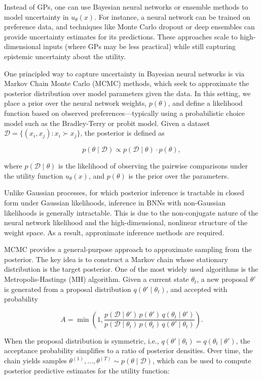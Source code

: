 \documentclass[
  letterpaper,
  numbers=noenddot,
  DIV=11]{scrreprt}
\theoremstyle{plain}
\theoremstyle{definition}
\theoremstyle{remark}
\begin{document}
Instead of GPs, one can use Bayesian neural networks or ensemble methods
to model uncertainty in \(u_\theta(x)\). For instance, a neural network
can be trained on preference data, and techniques like Monte Carlo
dropout or deep ensembles can provide uncertainty estimates for its
predictions. These approaches scale to high-dimensional inputs (where
GPs may be less practical) while still capturing epistemic uncertainty
about the utility.

One principled way to capture uncertainty in Bayesian neural networks is
via Markov Chain Monte Carlo (MCMC) methods, which seek to approximate
the posterior distribution over model parameters given the data. In this
setting, we place a prior over the neural network weights,
\(p(\theta)\), and define a likelihood function based on observed
preferences---typically using a probabilistic choice model such as the
Bradley-Terry or probit model. Given a dataset
\(\mathcal{D} = \{(x_i, x_j) : x_i \succ x_j\}\), the posterior is
defined as

\[
p(\theta \mid \mathcal{D}) \propto p(\mathcal{D} \mid \theta) \cdot p(\theta),
\]

where \(p(\mathcal{D} \mid \theta)\) is the likelihood of observing the
pairwise comparisons under the utility function \(u_\theta(x)\), and
\(p(\theta)\) is the prior over the parameters.

Unlike Gaussian processes, for which posterior inference is tractable in
closed form under Gaussian likelihoods, inference in BNNs with
non-Gaussian likelihoods is generally intractable. This is due to the
non-conjugate nature of the neural network likelihood and the
high-dimensional, nonlinear structure of the weight space. As a result,
approximate inference methods are required.

MCMC provides a general-purpose approach to approximate sampling from
the posterior. The key idea is to construct a Markov chain whose
stationary distribution is the target posterior. One of the most widely
used algorithms is the Metropolis-Hastings (MH) algorithm. Given a
current state \(\theta_t\), a new proposal \(\theta'\) is generated from
a proposal distribution \(q(\theta' \mid \theta_t)\), and accepted with
probability

\[
A = \min\left(1, \frac{p(\mathcal{D} \mid \theta') \, p(\theta') \, q(\theta_t \mid \theta')}{p(\mathcal{D} \mid \theta_t) \, p(\theta_t) \, q(\theta' \mid \theta_t)}\right).
\]

When the proposal distribution is symmetric, i.e.,
\(q(\theta' \mid \theta_t) = q(\theta_t \mid \theta')\), the acceptance
probability simplifies to a ratio of posterior densities. Over time, the
chain yields samples
\(\theta^{(1)}, \dots, \theta^{(T)} \sim p(\theta \mid \mathcal{D})\),
which can be used to compute posterior predictive estimates for the
utility function:
\end{document}
